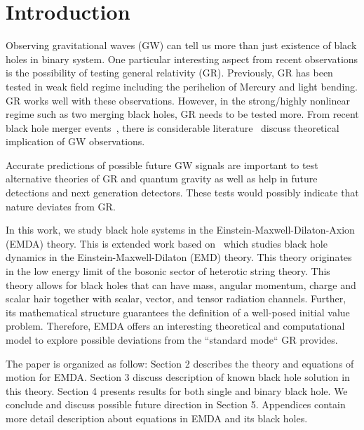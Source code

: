 \documentclass[%
 reprint,
 amsmath,amssymb,
 aps,
]{revtex4-1}
\begin{document}

\section{Introduction}

Observing gravitational waves (GW) can tell us more than just existence of black holes in binary system. One particular interesting aspect from recent observations is the possibility of testing general relativity (GR). Previously, GR has been tested in weak field regime including the perihelion of Mercury and light bending. GR works well with these observations. However, in the strong/highly nonlinear regime such as two merging black holes, GR needs to be tested more. From recent black hole merger events~\cite{ligo.prl.2016, ligo.prl2.2016, ligo.prl3.2017, ligo.apj.2017, ligo.prl4.2017}, there is considerable literature~\cite{PhysRevLett.116.221101,PhysRevD.94.084002} discuss theoretical implication of GW observations.

Accurate predictions of possible future GW signals are important to test alternative theories of GR and quantum gravity as well as help in future detections and next generation detectors. These tests would possibly indicate that nature deviates from GR. 

In this work, we study black hole systems in the Einstein-Maxwell-Dilaton-Axion (EMDA) theory. This is extended work based on~\cite{PhysRevD.97.064032} which studies black hole dynamics in the Einstein-Maxwell-Dilaton (EMD) theory. This theory originates in the low energy limit of the bosonic sector of heterotic string theory. This theory allows for black holes that can have mass, angular momentum, charge and scalar hair together with scalar, vector, and tensor radiation channels. Further, its mathematical structure guarantees the definition of a well-posed initial value problem. Therefore, EMDA offers an interesting theoretical and computational model to explore possible deviations from the ``standard mode`` GR provides.

The paper is organized as follow: Section 2 describes the theory and equations of motion for EMDA. Section 3 discuss description of known black hole solution in this theory. Section 4 presents results for both single and binary black hole. We conclude and discuss possible future direction in Section 5. Appendices contain more detail description about equations in EMDA and its black holes.
\end{document}
